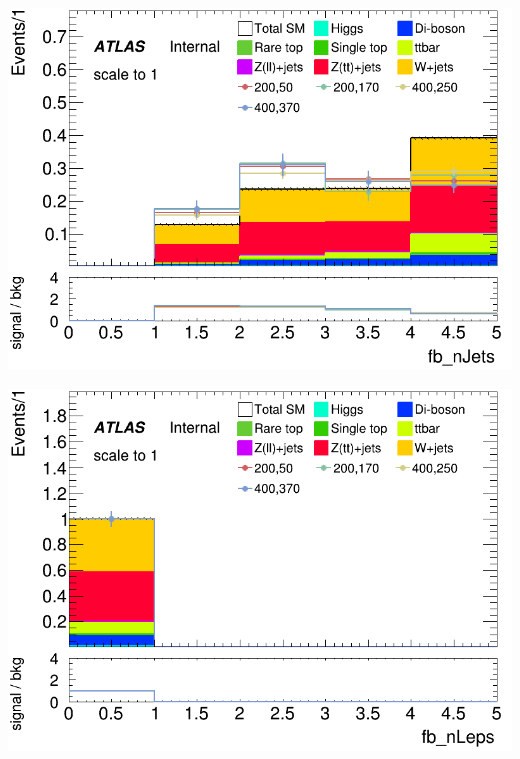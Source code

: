 \documentclass[usenames,dvipsnames]{beamer}
\begin{document}
\begin{frame}
    \begin{minipage}{0.32\textwidth}
        \centering
        \includegraphics[width=\textwidth]{graphics/HH_met_sig/HH_fb_nJets_norm.png}
    \end{minipage}
    \begin{minipage}{0.32\textwidth}
        \centering
        \includegraphics[width=\textwidth]{graphics/HH_met_sig/HH_fb_nLeps_norm.png}
    \end{minipage}
    \hfil
    \begin{minipage}{0.32\textwidth}
        \centering

\end{minipage}
\end{frame}
\end{document}

